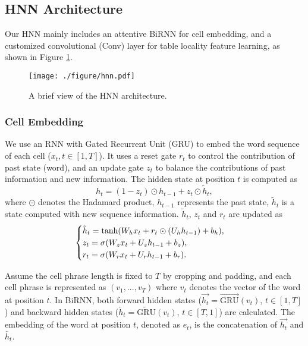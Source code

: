 \documentclass{article}
\begin{document}
\subsection{HNN Architecture}
Our HNN mainly includes an attentive BiRNN for cell embedding,
and a customized convolutional (Conv) layer for table locality feature learning, 
as shown in Figure \ref{fig:hnn}.
\vspace{-0.2cm}
\begin{figure}[h]
\centering
\texttt{[image: ./figure/hnn.pdf]}
\vspace{-0.35cm}
\caption{A brief view of the HNN architecture.
}
\label{fig:hnn}
\end{figure}
\vspace{-0.2cm}

\subsubsection{Cell Embedding}
We use an RNN with Gated Recurrent Unit (GRU) \cite{bhagavatula2015tabel} to embed the word sequence of each cell ($x_t, t \in \left[1,T \right]$).
It uses 
a reset gate $r_t$ to control the contribution of past state (word), 
and an update gate $z_t$ to balance the contributions of past information and new information.
The hidden state at position $t$ is computed as
\begin{equation}\label{eq:rnn1}
h_t = (1-z_t) \odot h_{t-1} + z_t \odot \tilde{h}_t,
\end{equation}
where $\odot$ denotes the Hadamard product, 
$h_{t-1}$ represents the past state,
$\tilde{h}_t$ is a state computed with new sequence information.
$\tilde{h}_t$, $z_t$ and $r_t$ are updated as
\vspace{-0.1cm}
\begin{equation}\label{eq:rnn2}
\begin{cases}
\tilde{h}_t = \text{tanh}(W_h x_t + r_t \odot (U_h h_{t-1}) + b_h), \\
z_t = \sigma(W_z x_t + U_z h_{t-1} + b_z), \\
r_t = \sigma(W_r x_t + U_r h_{t-1} + b_r).
\end{cases}
\vspace{-0.1cm}
\end{equation}

Assume the cell phrase length is fixed to $T$ by cropping and padding,
and each cell phrase is represented as $(v_1,...,v_T)$ where $v_t$ denotes the vector of the word at position $t$.
In BiRNN, 
both forward hidden states ($\overrightarrow{h_t} = \overrightarrow{\text{GRU}}(v_t)$, $t \in \left[1,T \right]$) and
backward hidden states ($\overleftarrow{h_t} = \overleftarrow{\text{GRU}}(v_t)$, $t \in \left[T,1 \right]$) are calculated.
The embedding of the word at position $t$, denoted as $e_t$, 
is the concatenation of $\overrightarrow{h_t}$ and $\overleftarrow{h_t}$.
\end{document}
